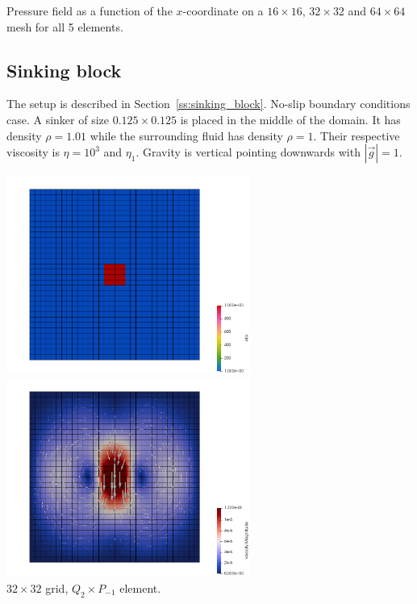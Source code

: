 \begin{center}
{\captionfont Pressure field as a function of the $x$-coordinate on a $16\times16$,
$32\times 32$ and $64\times 64$ mesh for all 5 elements.} 
\end{center}

\newpage
\subsection*{Sinking block}

The setup is described in Section~\ref{ss:sinking_block}. No-slip boundary conditions case.
A sinker of size $0.125\times 0.125$ is placed in the middle of the domain. It has density
$\rho=1.01$ while the surrounding fluid has density $\rho=1$. Their respective viscosity is
$\eta=10^3$ and $\eta_1$. Gravity is vertical pointing downwards with $|\vec g|=1$.


\begin{center}
\includegraphics[width=8cm]{python_codes/fieldstone_112/results/exp2/eta}
\includegraphics[width=8cm]{python_codes/fieldstone_112/results/exp2/vel}\\
{\captionfont $32\times 32$ grid, $Q_2\times P_{-1}$ element.}
\end{center}

